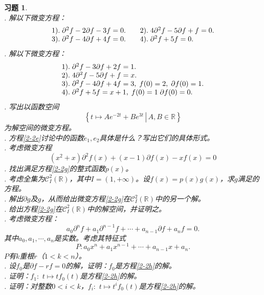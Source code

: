 \documentclass[12pt,UTF8]{ctexbook}
\theoremstyle{definition}
\theoremstyle{plain}
\newtheorem{xt}{习题}[section]
\begin{document}
\begin{xt}
    \mbox{} \\
    . 解以下微变方程：\\
    $$
    \begin{array}[]{ll}
        1).\;\partial^2 f - 2 \partial f - 3 f = 0. &\quad2).\; 4\partial^2 f - 5 \partial f + f = 0. \\
        3).\;\partial^2 f - 4 \partial f + 4 f = 0. &\quad4).\; \partial^2 f + 5 f = 0. 
    \end{array}
    $$
    . 解以下微变方程：\\
    $$
    \begin{array}[]{l}
        1).\;\partial^2 f - 3 \partial f + 2 f = 1. \\
        2).\; 4\partial^2 f - 5 \partial f + f = x. \\
        3).\;\partial^2 f - 4 \partial f + 4 f = 3, \; f(0) = 2,\; \partial f(0) = 1.\\
        4).\; \partial^2 f + 5 f = x + 1,\; f(0)=1\; \partial f(0) = 0. 
    \end{array}
    $$
    . 写出以函数空间
    $$ \left\{\left.t \mapsto Ae^{-2t} + Be^{3t}\,\right|\, A, B \in \mathbb{R}\right\} $$
    为解空间的微变方程。\\
    . 方程\eqref{2-2e}讨论中的函数$e_1, e_2$具体是什么？写出它们的具体形式。\\
    . 考虑微变方程
    \begin{equation}
        (x^2 + x) \partial^2 f(x) + (x - 1) \partial f(x) - x f(x) = 0 \label{2-2g} \tag{a}
    \end{equation}
    . 找出满足方程\eqref{2-2g}的整式函数$p(x)$。\\
    . 考虑全集为$\mathcal{C}^2_{I}(\mathbb{R})$，其中$I = (1, +\infty)$。设$f(x) = p(x)g(x)$，求$g$满足的方程。\\
    . 解出$\partial g$及$g$，从而给出微变方程\eqref{2-2g}在$\mathcal{C}^2_{I}(\mathbb{R})$中的另一个解。\\
    . 给出方程\eqref{2-2g}在$\mathcal{C}^2_{I}(\mathbb{R})$中的解空间，并证明之。\\
    . 考虑微变方程：
    \begin{equation}
        a_0\partial^n f + a_1 \partial^{n-1} f + \cdots + a_{n-1}\partial f + a_n f = 0. \label{2-2h} \tag{b}
    \end{equation}
    其中$a_0, a_1, \cdots , a_n$是实数。考虑其特征式
    $$P: a_0x^n + a_1 x^{n-1} + \cdots + a_{n-1}x + a_n . $$
    $P$有$k$重根$r$（$1<k<n$）。\\
    . 设$f_0$是$\partial f - rf = 0$的解，证明：$f_0$是方程\eqref{2-2h}的解。\\
    . 证明：$f_1:\,\,t\mapsto tf_0(t)$是方程\eqref{2-2h}的解。\\
    . 证明：对整数$0<i<k$，$f_i:\,\,t\mapsto t^if_0(t)$是方程\eqref{2-2h}的解。
\end{xt}
\end{document}
